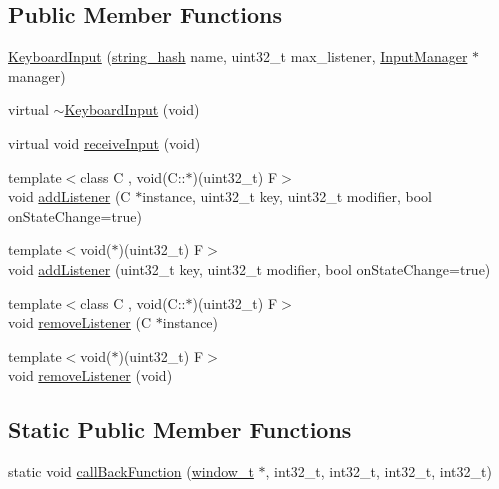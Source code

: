 \subsection*{Public Member Functions}
\begin{DoxyCompactItemize}
\item 
\hyperlink{classcrap_1_1_keyboard_input_aee4763d39526518f64d931c6c7a2fc7a}{Keyboard\+Input} (\hyperlink{classcrap_1_1string__hash}{string\+\_\+hash} name, uint32\+\_\+t max\+\_\+listener, \hyperlink{classcrap_1_1_input_manager}{Input\+Manager} $\ast$manager)
\item 
virtual \hyperlink{classcrap_1_1_keyboard_input_a76b3a8c053a5734674157632046ae3c6}{$\sim$\+Keyboard\+Input} (void)
\item 
virtual void \hyperlink{classcrap_1_1_keyboard_input_abe408b019f5ff2cd57478e6214e67e85}{receive\+Input} (void)
\item 
{\footnotesize template$<$class C , void(\+C\+::$\ast$)(uint32\+\_\+t) F$>$ }\\void \hyperlink{classcrap_1_1_keyboard_input_ad11bcffc4ac9f11b1faeb0562eace9da}{add\+Listener} (C $\ast$instance, uint32\+\_\+t key, uint32\+\_\+t modifier, bool on\+State\+Change=true)
\item 
{\footnotesize template$<$void($\ast$)(uint32\+\_\+t) F$>$ }\\void \hyperlink{classcrap_1_1_keyboard_input_a3bbc9cc28c81a4307d5b512de41f38bf}{add\+Listener} (uint32\+\_\+t key, uint32\+\_\+t modifier, bool on\+State\+Change=true)
\item 
{\footnotesize template$<$class C , void(\+C\+::$\ast$)(uint32\+\_\+t) F$>$ }\\void \hyperlink{classcrap_1_1_keyboard_input_af5e331fa0e56781f886166f74e40fccd}{remove\+Listener} (C $\ast$instance)
\item 
{\footnotesize template$<$void($\ast$)(uint32\+\_\+t) F$>$ }\\void \hyperlink{classcrap_1_1_keyboard_input_afd49b84acfdfd479e4e538811b191e1c}{remove\+Listener} (void)
\end{DoxyCompactItemize}
\subsection*{Static Public Member Functions}
\begin{DoxyCompactItemize}
\item 
static void \hyperlink{classcrap_1_1_keyboard_input_aa2ec9098b93017ab5ff82a178c9dff3c}{call\+Back\+Function} (\hyperlink{namespacecrap_a3917356677c911215fe8f50465f335bf}{window\+\_\+t} $\ast$, int32\+\_\+t, int32\+\_\+t, int32\+\_\+t, int32\+\_\+t)
\end{DoxyCompactItemize}
